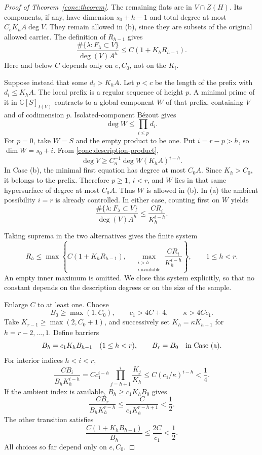 \begin{proof}[Proof of Theorem~\ref{conc:theorem}]
The remaining flats are in $V\cap Z(H)$.  Its components, if any,
have dimension $s_0+h-1$ and total degree at most
$C_eK_hA\deg V$.  They remain allowed in (b), since they are subsets
of the original allowed carrier.  The definition of $R_{h-1}$ gives
\begin{equation}
 \frac{\#\{\lambda:F_\lambda\subset V\}}{\deg(V)A^h}
 \leq C(1+K_hR_{h-1}).
 \label{conc:low-recurrence}
\end{equation}
Here and below $C$ depends only on $e,C_0$, not on the $K_i$.

Suppose instead that some $d_i>K_hA$.  Let $p<c$ be the length of
the prefix with $d_i\leq K_hA$.  The local prefix is a regular
sequence of height $p$.  A minimal prime of it in
$\mathbb C[S]_{I(V)}$ contracts to a global component $W$ of that
prefix, containing $V$ and of codimension $p$.  Isolated-component
B\'ezout gives
\[
 \deg W\leq\prod_{i\leq p}d_i.
\]
For $p=0$, take $W=S$ and the empty product to be one.  Put
$i=r-p>h$, so $\dim W=s_0+i$.  From
\eqref{conc:description-product},
\begin{equation}
 \deg V\geq C_n^{-1}\deg W(K_hA)^{i-h}.
 \label{conc:degree-comparison}
\end{equation}
In Case (b), the minimal first equation has degree at most $C_0A$.
Since $K_h>C_0$, it belongs to the prefix.  Therefore $p\geq1$,
$i<r$, and $W$ lies in that same hypersurface of degree at most
$C_0A$.  Thus $W$ is allowed in (b).  In (a) the ambient possibility
$i=r$ is already controlled.  In either case, counting first on $W$
yields
\begin{equation}
 \frac{\#\{\lambda:F_\lambda\subset V\}}{\deg(V)A^h}
 \leq \frac{C R_i}{K_h^{i-h}}.
 \label{conc:high-recurrence}
\end{equation}

Taking suprema in the two alternatives gives the finite system
\begin{equation}
 R_h\leq\max\left\{
 C(1+K_hR_{h-1}),\quad
 \max_{\substack{i>h\\i\text{ available}}}
       \frac{CR_i}{K_h^{i-h}}\right\},
 \qquad1\leq h<r.
 \label{conc:recurrence-system}
\end{equation}
An empty inner maximum is omitted.  We close this system explicitly,
so that no constant depends on the description degrees or on the
size of the sample.

Enlarge $C$ to at least one.  Choose
\[
 B_0\geq\max(1,C_0),\qquad c_1>4C+4,\qquad \kappa>4Cc_1.
\]
Take $K_{r-1}\geq\max(2,C_0+1)$, and successively set
$K_h=\kappa K_{h+1}$ for $h=r-2,\ldots,1$.  Define barriers
\[
 B_h=c_1K_hB_{h-1}\quad(1\leq h<r),
 \qquad B_r=B_0\quad\hbox{in Case (a)}.
\]
For interior indices $h<i<r$,
\[
 \frac{CB_i}{B_hK_h^{i-h}}
 =C c_1^{i-h}\prod_{j=h+1}^{i}\frac{K_j}{K_h}
 \leq C(c_1/\kappa)^{i-h}<\frac14.
\]
If the ambient index is available, $B_h\geq c_1K_hB_0$ gives
\[
 \frac{CB_r}{B_hK_h^{r-h}}
 \leq\frac{C}{c_1K_h^{r-h+1}}<\frac12.
\]
The other transition satisfies
\[
 \frac{C(1+K_hB_{h-1})}{B_h}\leq\frac{2C}{c_1}<\frac12.
\]
All choices so far depend only on $e,C_0$.


\end{proof}
